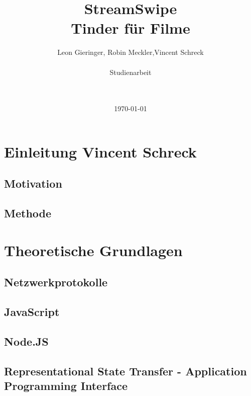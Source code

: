 \documentclass[11pt,a4paper]{article}
\title{StreamSwipe\\Tinder für Filme\vspace{10px}}
\author{Leon Gieringer, Robin Meckler,Vincent Schreck \\ \\ Studienarbeit \\ \\ \\}
\date{\today}
\begin{document}
\maketitle
\thispagestyle{empty}
\newpage
{}
\tableofcontents
\newpage
\listoffigures
\newpage
\lstlistoflistings
\newpage
{}



\pagestyle{fancy}
\fancyhf{}
\setlength{\headheight}{35pt}

\renewcommand\headrulewidth{0.4pt}

\fancyhead[LE,RO]{\rightmark}%
\renewcommand{\sectionmark}[1]{\markright{#1}}
\renewcommand{\subsectionmark}[1]{\markright{#1}}
\renewcommand{\subsubsectionmark}[1]{\markright{#1}}

\cfoot{\thepage}
\newpage


\section[Einleitung]{Einleitung \hfill \normalfont \small{Vincent Schreck}}

\subsection{Motivation}

\subsection{Methode}

\clearpage

\section{Theoretische Grundlagen}
\subsection{Netzwerkprotokolle}

\subsection{JavaScript}

\subsection{Node.JS}

\subsection{Representational State Transfer - Application Programming Interface}

\end{document}
